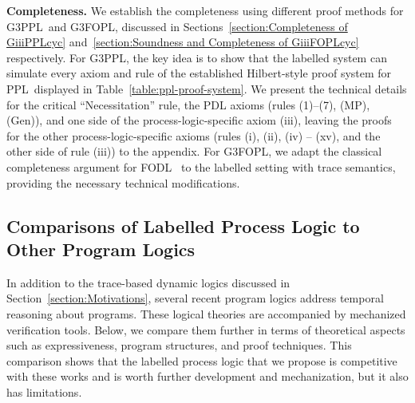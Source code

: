 \documentclass[manuscript,screen]{acmart}
\newcommand{\GiiiPPL}[0]{\mbox{G3PPL}}
\newcommand{\GiiiPPLcyc}[0]{\mbox{G3PPL}}
\newcommand{\GiiiFOPL}[0]{\mbox{G3FOPL}}
\newcommand{\GiiiFOPLcyc}[0]{\mbox{G3FOPL}}
\newcommand{\PPL}[0]{\mbox{PPL}}
\newcommand{\FODL}[0]{\mbox{FODL}}
\begin{document}
\textbf{Completeness.}  We establish the completeness using different proof methods for \GiiiPPL\ and \GiiiFOPL, discussed in Sections~\ref{section:Completeness of GiiiPPLcyc} and~\ref{section:Soundness and Completeness of GiiiFOPLcyc} respectively.  For \GiiiPPLcyc, the key idea is to show that the labelled system can simulate every axiom and rule of the established Hilbert-style proof system for \PPL\ displayed in Table~\ref{table:ppl-proof-system}.  We present the technical details for the critical ``Necessitation'' rule, the PDL axioms (rules (1)--(7), (MP), (Gen)), and one side of the process-logic-specific axiom (iii), leaving the proofs for the other process-logic-specific axioms (rules (i), (ii), (iv) -- (xv), and the other side of rule (iii)) to the appendix.  For \GiiiFOPLcyc, we adapt the classical completeness argument for \FODL~\cite{Harel79,Harel00} to the labelled setting with trace semantics, providing the necessary technical modifications. 

\subsection{Comparisons of Labelled Process Logic to Other Program Logics}
\label{section:Comparisons to Other Program Logics}



In addition to the trace-based dynamic logics discussed in Section~\ref{section:Motivations}, several recent program logics address temporal reasoning about programs. 
These logical theories are accompanied by mechanized verification tools. 
Below, we compare them further in terms of theoretical aspects such as expressiveness, program structures, and proof techniques. This comparison shows that the labelled process logic that we propose is competitive with these works and is worth further development and mechanization, but it also has limitations. 
\end{document}
